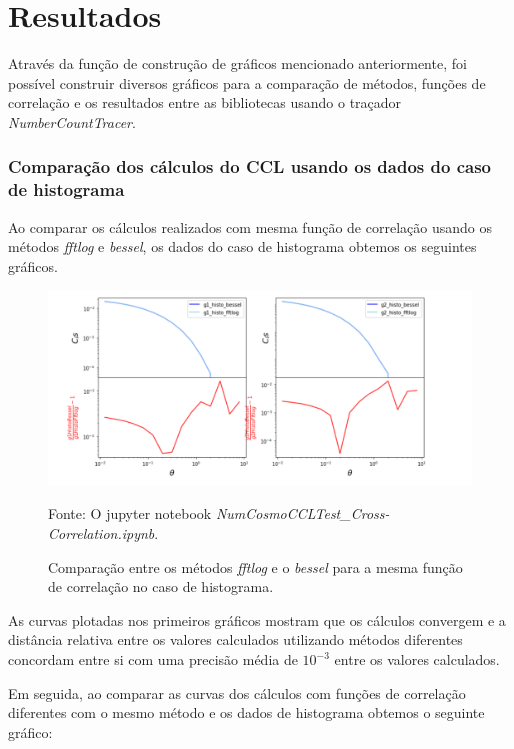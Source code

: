 	\chapter*{Resultados}

Através da função de construção de gráficos mencionado anteriormente, foi possível construir diversos gráficos para a comparação de métodos, funções de correlação e os resultados entre as bibliotecas usando o traçador \textit{NumberCountTracer}. 

\subsection*{Comparação dos cálculos do CCL usando os dados do caso de histograma}

Ao comparar os cálculos realizados com mesma função de correlação usando os métodos \textit{fftlog} e \textit{bessel}, os dados do caso de histograma obtemos os seguintes gráficos.

\begin{figure}[h!]
	\centering
	\caption{Comparação entre os métodos \textit{fftlog} e o \textit{bessel} para a mesma função de correlação no caso de histograma.}
	\label{fig:fig1}
	\includegraphics[width=0.7\linewidth]{figuras/fig1}
	
	Fonte: O jupyter notebook \textit{NumCosmoCCLTest\_Cross-Correlation.ipynb}.
\end{figure}

As curvas plotadas nos primeiros gráficos mostram que os cálculos convergem e a distância relativa entre os valores calculados utilizando métodos diferentes concordam entre si com uma precisão média de $ 10^{-3} $ entre os valores calculados. 

\newpage
Em seguida, ao comparar as curvas dos cálculos com funções de correlação diferentes com o mesmo método e os dados de histograma obtemos o seguinte gráfico:

